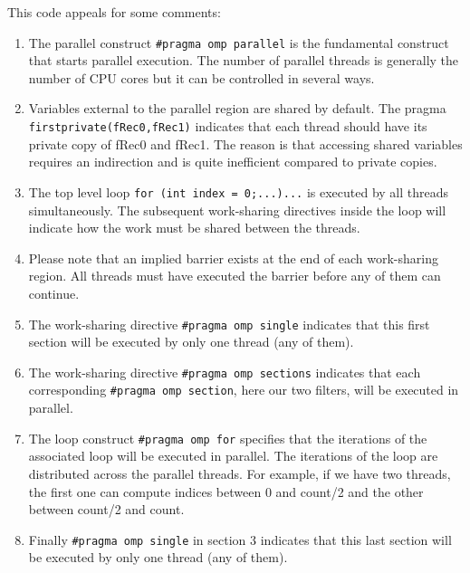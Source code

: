 \documentclass[a4paper,10pt]{book}
\begin{document}
This code appeals for some comments:

\begin{enumerate}
\item The parallel construct \lstinline!#pragma omp parallel! is the fundamental construct that starts parallel execution. The number of parallel threads is generally the number of CPU cores but it can be controlled in several ways.

\item Variables external to the parallel region are shared by default. The pragma \lstinline!firstprivate(fRec0,fRec1)! indicates that each thread should have its private copy of fRec0 and fRec1. The reason is that accessing shared variables requires an indirection and is quite inefficient compared to private copies.

\item The top level loop \lstinline!for (int index = 0;...)...! is executed by all threads simultaneously. The subsequent work-sharing directives inside the loop will indicate how the work must be shared between the threads. 

\item Please note that an implied barrier exists at the end of each work-sharing region. All threads must have executed the barrier before any of them can continue.

\item The work-sharing directive \lstinline!#pragma omp single! indicates that this first section will be executed by only one thread (any of them).

\item The work-sharing directive \lstinline!#pragma omp sections! indicates that each corresponding \lstinline!#pragma omp section!, here our two filters, will be executed in parallel.

\item The loop construct \lstinline!#pragma omp for! specifies that the iterations of the associated loop will be executed in parallel. The iterations of the loop are distributed across the parallel threads. For example, if we have two threads, the first one can compute indices between 0 and count/2 and the other between count/2 and count. 

\item Finally \lstinline!#pragma omp single!  in section 3 indicates that this last section will be executed by only one thread (any of them).

\end{enumerate}
\end{document}
